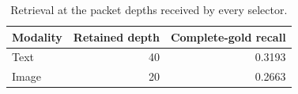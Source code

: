 \begin{table}[t]
\centering
\caption{Retrieval at the packet depths received by every selector.}
\label{tab:operating-retrieval}
\begin{tabular}{lrr}
\toprule
Modality & Retained depth & Complete-gold recall \\
\midrule
Text & 40 & 0.3193 \\
Image & 20 & 0.2663 \\
\bottomrule
\end{tabular}
\end{table}
